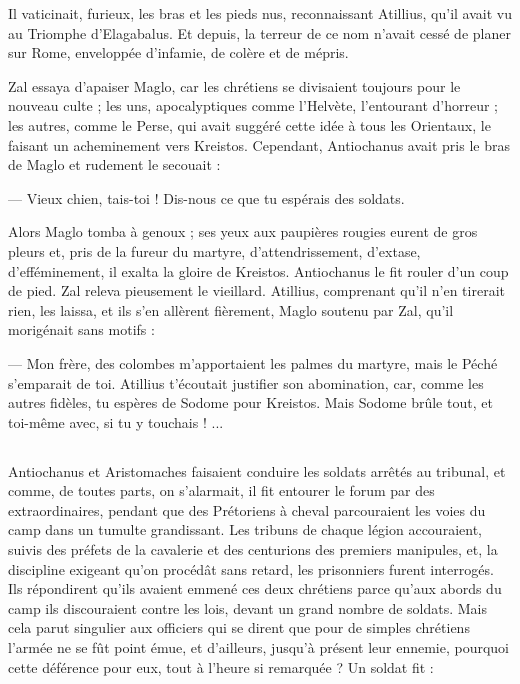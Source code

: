 \documentclass[a4paper, 11pt, oneside, polutonikogreek, french]{article}
\begin{document}
Il vaticinait, furieux, les bras et les pieds nus, reconnaissant Atillius, qu'il avait vu au Triomphe d'Elagabalus. Et depuis, la terreur de ce nom n'avait cessé de planer sur Rome, enveloppée d'infamie, de colère et de mépris.

Zal essaya d'apaiser Maglo, car les chrétiens se divisaient toujours pour le nouveau culte ; les uns, apocalyptiques comme l'Helvète, l'entourant d'horreur ; les autres, comme le Perse, qui avait suggéré cette idée à tous les Orientaux, le faisant un acheminement vers Kreistos. Cependant, Antiochanus avait pris le bras de Maglo et rudement le secouait :

--- Vieux chien, tais-toi ! Dis-nous ce que tu espérais des soldats.

Alors Maglo tomba à genoux ; ses yeux aux paupières rougies eurent de gros pleurs et, pris de la fureur du martyre, d'attendrissement, d'extase, d'efféminement, il exalta la gloire de Kreistos. Antiochanus le fit rouler d'un coup de pied. Zal releva pieusement le vieillard. Atillius, comprenant qu'il n'en tirerait rien, les laissa, et ils s'en allèrent fièrement, Maglo soutenu par Zal, qu'il morigénait sans motifs :

--- Mon frère, des colombes m'apportaient les palmes du martyre, mais le Péché s'emparait de toi. Atillius t'écoutait justifier son abomination, car, comme les autres fidèles, tu espères de Sodome pour Kreistos. Mais Sodome brûle tout, et toi-même avec, si tu y touchais ! ...
\clearpage
\subsection{}
\paragraph{}
Antiochanus et Aristomaches faisaient conduire les soldats arrêtés au tribunal, et comme, de toutes parts, on s'alarmait, il fit entourer le forum par des extraordinaires, pendant que des Prétoriens à cheval parcouraient les voies du camp dans un tumulte grandissant. Les tribuns de chaque légion accouraient, suivis des préfets de la cavalerie et des centurions des premiers manipules, et, la discipline exigeant qu'on procédât sans retard, les prisonniers furent interrogés. Ils répondirent qu'ils avaient emmené ces deux chrétiens parce qu'aux abords du camp ils discouraient contre les lois, devant un grand nombre de soldats. Mais cela parut singulier aux officiers qui se dirent que pour de simples chrétiens l'armée ne se fût point émue, et d'ailleurs, jusqu'à présent leur ennemie, pourquoi cette déférence pour eux, tout à l'heure si remarquée ? Un soldat fit :
\end{document}
